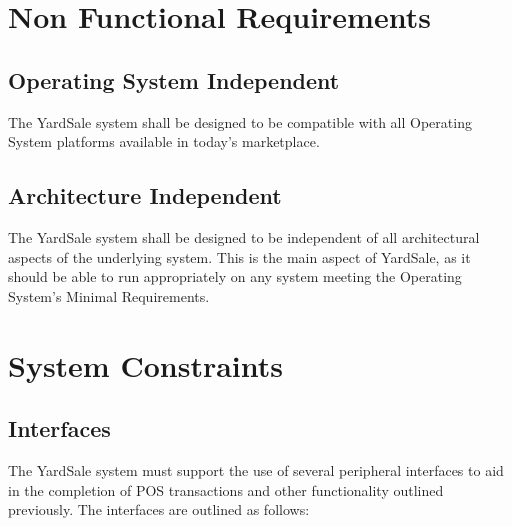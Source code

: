 \documentclass{report}
\begin{document}
    \section{Non Functional Requirements}

        \subsection{Operating System Independent}
            The YardSale system shall be designed to be compatible
            with all Operating System platforms available in
            today's marketplace.

        \subsection{Architecture Independent}
            The YardSale system shall be designed to be
            independent of all architectural aspects of the
            underlying system.  This is the main aspect of
            YardSale, as it should be able to run appropriately on
            any system meeting the Operating System's Minimal
            Requirements.

    \section{System Constraints}
        \subsection{Interfaces}
            The YardSale system must support the use of several peripheral interfaces
            to aid in the completion of POS transactions and other functionality outlined
            previously.  The interfaces are outlined as follows:
\end{document}
